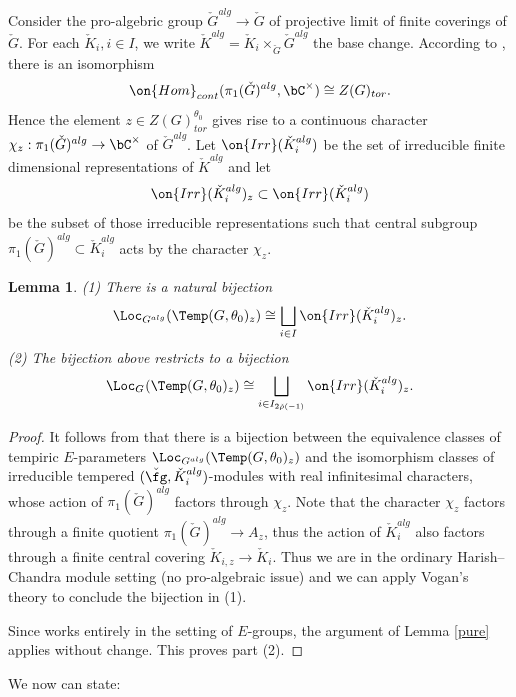 \documentclass[12pt]{amsart}
\newtheorem{lem}[thm]{Lemma}
\theoremstyle{remark}
\begin{document}
Consider the pro-algebric group 
$\check G^{alg}\to\check G$ of projective limit of finite coverings of $\check G$.
For each $\check K_i, i\in I$, we 
write $\check K^{alg}=\check K_i\times_{\check G}\check G^{alg}$
the base change.
According to \cite[Section 10]{ABV},
there is an isomorphism
\[\on{Hom}_{cont}(\pi_1(\check G)^{alg},\bC^\times)\cong Z(G)_{tor}.\]
Hence the element $z\in Z(G)_{tor}^{\theta_0}$ gives rise to a continuous character 
$\chi_z:\pi_1(\check G)^{alg}\to\bC^\times$
of $\check G^{alg}$.
Let $\on{Irr}(\check K_{i}^{alg})$ be the set of  irreducible finite dimensional 
representations of $\check K^{alg}$ and  
let  
\[\on{Irr}(\check K^{alg}_{i})_z\subset \on{Irr}(\check K_{i}^{alg})\] be the subset of 
those irreducible representations such that  
central subgroup $\pi_1(\check G)^{alg}\subset\check K^{alg}_{i}$
acts by the character $\chi_z$.


\begin{lem}\label{proj}
(1) There is a natural bijection
\[\Loc_{G^{alg}}(\Temp(G,\theta_0)_z)\cong\bigsqcup_{i\in I}\on{Irr}(\check K^{alg}_i)_z.\]
(2) The bijection above restricts to a bijection
\[\Loc_{G^{}}(\Temp(G,\theta_0)_z)\cong\bigsqcup_{i\in I_{2\check\rho(-1)}}\on{Irr}(\check K^{alg}_i)_z.\]
    \end{lem}
\begin{proof}
 It follows 
from
\cite[Theorem 10.4]{ABV} that  there is a bijection between the equivalence classes of tempiric $E$-parameters 
$\Loc_{G^{alg}}(\Temp(G,\theta_0)_z)$ and the isomorphism classes of irreducible tempered $(\check\fg,\check K_i^{alg})$-modules with real infinitesimal characters, whose  action of $\pi_1(\check G)^{alg}$ factors through $\chi_z$.
Note that the character $\chi_z$ factors through 
a finite quotient $\pi_1(\check G)^{alg}\to A_z$, thus 
the action of $\check K_i^{alg}$ also factors through a finite central covering $\check K_{i,z}\to\check K_i$.
Thus we are in the ordinary Harish–Chandra module setting (no pro-algebraic issue)
and we can apply Vogan's theory \cite{V} to conclude the bijection in (1).

Since \cite{ABV} works entirely in the setting of $E$-groups, the argument of Lemma \ref{pure} applies without change. This proves part (2).
\end{proof}


We now can state:
\end{document}
